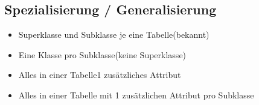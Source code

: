\documentclass[a4paper,8pt]{article} %
\begin{document}
\begin{small}
\begin{minipage}{0.35 \linewidth}
		\section{Spezialisierung / Generalisierung}
			\begin{itemize}
				\item Superklasse und Subklasse je eine Tabelle(bekannt)
				\item Eine Klasse pro Subklasse(keine Superklasse)
				\item Alles in einer Tabelle1 zusätzliches Attribut
				\item Alles in einer Tabelle mit 1 zusätzlichen Attribut pro Subklasse
			\end{itemize}
	\end{minipage}

	\end{small}
\end{document}
